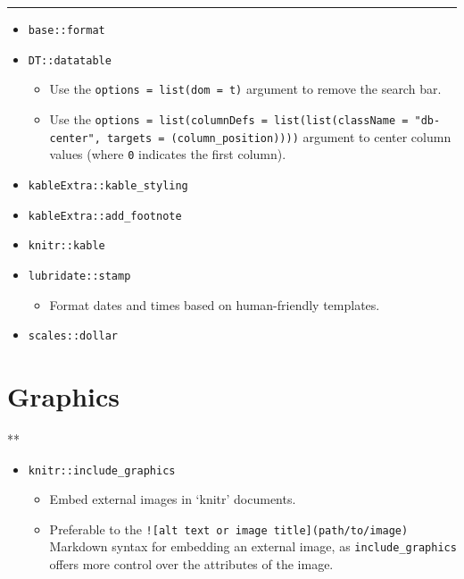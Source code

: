 \documentclass[
]{book}
\providecommand{\tightlist}{%
  \setlength{\itemsep}{0pt}\setlength{\parskip}{0pt}}
\begin{document}
\begin{center}\rule{0.5\linewidth}{0.5pt}\end{center}

\begin{itemize}
\tightlist
\item
  \texttt{base::format}
\item
  \texttt{DT::datatable}

  \begin{itemize}
  \tightlist
  \item
    Use the \texttt{options\ =\ list(dom\ =\ \textquotesingle{}t\textquotesingle{})} argument to remove the search bar.
  \item
    Use the \texttt{options\ =\ list(columnDefs\ =\ list(list(className\ =\ "db-center",\ targets\ =\ (column\_position))))} argument to center column values (where \texttt{0} indicates the first column).
  \end{itemize}
\item
  \texttt{kableExtra::kable\_styling}
\item
  \texttt{kableExtra::add\_footnote}
\item
  \texttt{knitr::kable}
\item
  \texttt{lubridate::stamp}

  \begin{itemize}
  \tightlist
  \item
    Format dates and times based on human-friendly templates.
  \end{itemize}
\item
  \texttt{scales::dollar}
\end{itemize}

\hypertarget{graphics}{%
\section{Graphics}\label{graphics}}

**

\begin{itemize}
\tightlist
\item
  \texttt{knitr::include\_graphics}

  \begin{itemize}
  \tightlist
  \item
    Embed external images in `knitr' documents.
  \item
    Preferable to the \texttt{!{[}alt\ text\ or\ image\ title{]}(path/to/image)} Markdown syntax for embedding an external image, as \texttt{include\_graphics} offers more control over the attributes of the image.
  \end{itemize}
\end{itemize}
\end{document}
